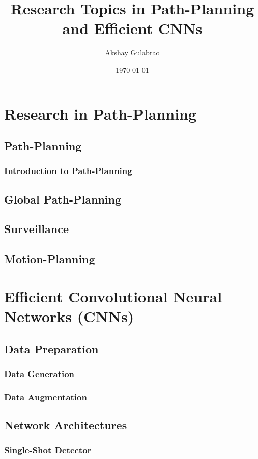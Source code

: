 \documentclass[12pt]{article}
\title{Research Topics in Path-Planning and Efficient CNNs}
\author{Akshay Gulabrao}
\date{\today}
\begin{document}

\section{Research in Path-Planning}
\subsection{Path-Planning}
\subsubsection{Introduction to Path-Planning}


\subsection{Global Path-Planning}

\subsection{Surveillance}

\subsection{Motion-Planning}

\section{Efficient Convolutional Neural Networks (CNNs)}
\subsection{Data Preparation}
\subsubsection{Data Generation}

\subsubsection{Data Augmentation}

\subsection{Network Architectures}
\subsubsection{Single-Shot Detector}
\end{document}
